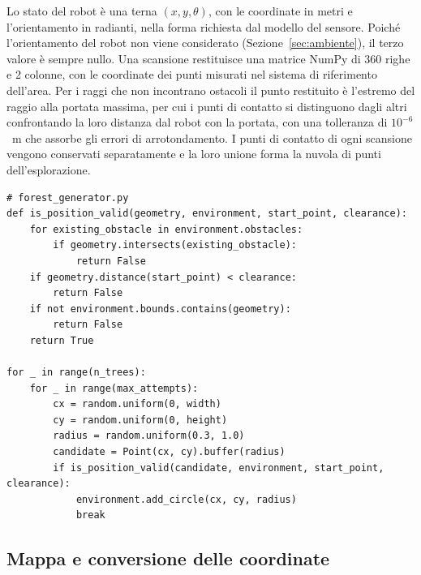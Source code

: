 Lo stato del robot è una terna $(x, y, \theta)$, con le coordinate in metri e l'orientamento in radianti, nella forma richiesta dal modello del sensore. Poiché l'orientamento del robot non viene considerato (Sezione~\ref{sec:ambiente}), il terzo valore è sempre nullo. Una scansione restituisce una matrice NumPy di 360 righe e 2 colonne, con le coordinate dei punti misurati nel sistema di riferimento dell'area. Per i raggi che non incontrano ostacoli il punto restituito è l'estremo del raggio alla portata massima, per cui i punti di contatto si distinguono dagli altri confrontando la loro distanza dal robot con la portata, con una tolleranza di $10^{-6}$~m che assorbe gli errori di arrotondamento. I punti di contatto di ogni scansione vengono conservati separatamente e la loro unione forma la nuvola di punti dell'esplorazione.

\begin{lstlisting}[float=!htb, label=lst:generatore, caption={Condizioni di accettazione di un ostacolo e collocazione degli alberi nel generatore del bosco.}]
# forest_generator.py
def is_position_valid(geometry, environment, start_point, clearance):
    for existing_obstacle in environment.obstacles:
        if geometry.intersects(existing_obstacle):
            return False
    if geometry.distance(start_point) < clearance:
        return False
    if not environment.bounds.contains(geometry):
        return False
    return True

for _ in range(n_trees):
    for _ in range(max_attempts):
        cx = random.uniform(0, width)
        cy = random.uniform(0, height)
        radius = random.uniform(0.3, 1.0)
        candidate = Point(cx, cy).buffer(radius)
        if is_position_valid(candidate, environment, start_point, clearance):
            environment.add_circle(cx, cy, radius)
            break
\end{lstlisting}

\subsection{Mappa e conversione delle coordinate}
\label{sec:dati_mappa}

